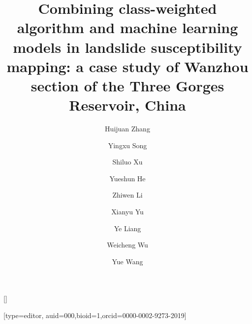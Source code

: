 \documentclass[a4paper,fleqn]{cas-sc}
\begin{document}
\let\WriteBookmarks\relax
\def\floatpagepagefraction{1}
\def\textpagefraction{.001}

\title [mode = title]{Combining class-weighted algorithm and machine learning models in landslide susceptibility mapping: a case study of Wanzhou section of the Three Gorges Reservoir, China}

\author[1,2]{Huijuan Zhang}[]

\author[3]{Yingxu Song} [type=editor,
auid=000,bioid=1,orcid=0000-0002-9273-2019]

\author[4]{Shiluo Xu}

\author[5]{Yueshun He}

\author[6]{Zhiwen Li}

\author[7]{Xianyu Yu}

\author[8]{Ye Liang}

\author[1]{Weicheng Wu}

\author[2]{Yue Wang}

\address[1]{Key Lab of Digital Land and Resources and Faculty of Earth Sciences, East China University of Technology, Nanchang, 330013, Jiangxi, China}
\address[2]{School of Earth Sciences, East China University of Technology, Nanchang, Jiangxi Province 330013, China}
\address[3]{Jiangxi Engineering Laboratory on Radioactive Geoscience and Big Data Technology, School of Information and Engineering, East China University of Technology, Nanchang, 330013, Jiangxi, China; yxsong@ecut.edu.cn}
\address[4]{School of Information Engineering, Huzhou University, Huzhou 313000, China; xushiluo@163.com} 
\address[5]{East China University of Technology, Nanchang, 330013, Jiangxi, China; heys@ecut.edu.cn} 
\address[6]{School of Environmental and Chemical Engineering, Foshan University, Foshan, 528000, China; lizw1982@163.com} 
\address[7]{School of Civil Engineering, Architecture and Environment, Hubei University of Technology, Wuhan, Hubei Province 430074, China; yuxianyu@hbut.edu.cn} 
\address[8]{Jiangxi Engineering Technology Research Center of Nuclear Geoscience Data Science and System, East China University of Technology, Nanchang, 330013, Jiangxi, China; liangye@ecut.edu.cn} 
\address[1]{Key Lab of Digital Land and Resources and Faculty of Earth Sciences, East China University of Technology, Nanchang, 330013, Jiangxi, China; wuwch@ecut.edu.cn/wuwc030903@sina.com} 
\address[2]{School of Earth Sciences, East China University of Technology, Nanchang, Jiangxi Province 330013, China; 2020210058@ecut.edu.cn} 
\end{document}
